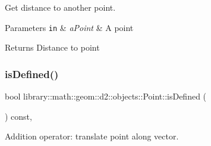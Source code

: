 Get distance to another point. 


\begin{DoxyParams}[1]{Parameters}
\mbox{\tt in}  & {\em a\+Point} & A point \\
\hline
\end{DoxyParams}
\begin{DoxyReturn}{Returns}
Distance to point 
\end{DoxyReturn}
\mbox{\label{classlibrary_1_1math_1_1geom_1_1d2_1_1objects_1_1_point_ac90251968d8eb11df82e28f6cf095e5c}} 
\subsubsection{\texorpdfstring{is\+Defined()}{isDefined()}}
{\footnotesize\ttfamily bool library\+::math\+::geom\+::d2\+::objects\+::\+Point\+::is\+Defined (\begin{DoxyParamCaption}{ }\end{DoxyParamCaption}) const\hspace{0.3cm}{\ttfamily [override]}, {\ttfamily [virtual]}}



Addition operator\+: translate point along vector. 


